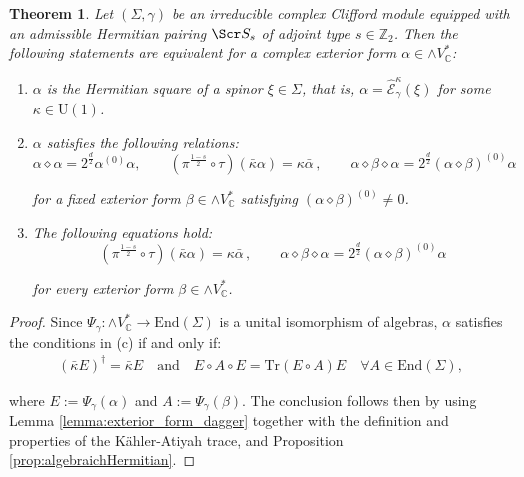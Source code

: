 \documentclass[10pt,a4paper,twoside,reqno]{amsart}
\theoremstyle{plain}
\newtheorem{thm}{Theorem}[section]
\theoremstyle{definition}
\theoremstyle{remark}
\newcommand{\End}{\mathrm{End}}
\def\C{\mathbb{C}}
\newcommand{\Tr}{\mathrm{Tr}}
\def\scS{\Scr S}
\def\U{\mathrm{U}}
\def\hcE{\widehat{\mathcal{E}}}
\begin{document}
\begin{thm}
\label{thm:even_Hermitian_forms}
Let $(\Sigma,\gamma)$ be an irreducible complex Clifford module equipped with an admissible Hermitian pairing $\scS_s$ of adjoint type $s\in \mathbb{Z}_2$. Then the following statements are equivalent for a complex exterior form $\alpha\in\wedge V^*_\C$: 
\begin{enumerate}
\item[\normalfont(a)] $\alpha$ is the Hermitian square of a spinor $\xi\in\Sigma$, that is, $\alpha = \hcE_\gamma^\kappa(\xi)$ for some $\kappa\in\U(1)$.
\item[\normalfont(b)] $\alpha$ satisfies the following relations:
\begin{equation*}
\alpha\diamond\alpha = 2^{\frac{d}{2}}\alpha^{(0)}\alpha,\qquad(\pi^{\frac{1-s}{2}}\circ\tau)(\bar\kappa\alpha) = \kappa \bar{\alpha}\, , \qquad \alpha \diamond \beta \diamond \alpha=2^{\frac{d}{2}}(\alpha\diamond\beta)^{(0)}\alpha
\end{equation*}

\noindent
for a fixed exterior form $\beta\in\wedge V^*_\C$ satisfying $(\alpha\diamond\beta)^{(0)}\neq0$.
\item[\normalfont(c)] The following equations hold: 
\begin{equation*}
(\pi^{\frac{1-s}{2}}\circ\tau)(\bar\kappa\alpha) = \kappa \bar{\alpha}\, , \qquad \alpha \diamond \beta \diamond \alpha=2^{\frac{d}{2}}(\alpha\diamond\beta)^{(0)}\alpha
\end{equation*}

\noindent
for every exterior form $\beta\in\wedge V^*_\C$.
\end{enumerate}
\end{thm}

\begin{proof}
Since $\Psi_\gamma\colon\wedge V^*_\C\to\End(\Sigma)$ is a unital isomorphism of algebras, $\alpha$ satisfies the conditions in (c) if and only if: 
\begin{eqnarray*}
(\bar{\kappa}E)^\dagger = \bar{\kappa}E\quad\text{and}\quad E\circ A\circ E = \Tr(E\circ A) E \quad \forall A\in\End(\Sigma),
\end{eqnarray*}

\noindent
where $E:=\Psi_\gamma(\alpha)$ and $A:=\Psi_\gamma(\beta)$. The conclusion follows then by using Lemma \ref{lemma:exterior_form_dagger} together with the definition and properties of the Kähler-Atiyah trace, and Proposition \ref{prop:algebraichHermitian}.
\end{proof}
\end{document}

